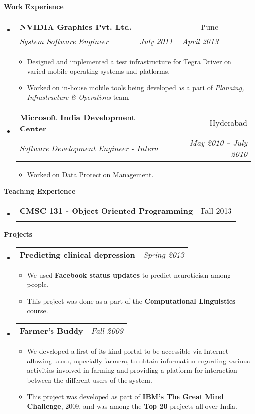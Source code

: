 \documentclass[letterpaper,12pt]{article}
\makeatletter
\newcommand{\resheading}[1]{{\large \colorbox{mygrey}{\begin{minipage}{\textwidth}{\textbf{#1 \vphantom{p\^{E}}}}\end{minipage}}}}
\newcommand{\ressubheading}[4]{
\begin{tabular*}{6in}{l@{\extracolsep{\fill}}r}
		\textbf{#1} & #2 \\
		\textit{#3} & \textit{#4} \\
\end{tabular*}\vspace{-6pt}}
\newcommand{\projectitem}[2]{
\begin{tabular*}{6in}{l@{\extracolsep{\fill}}r}
		\textbf{#1} & \textit{#2} 
\end{tabular*}\vspace{-6pt}}
\makeatother
\begin{document}
\resheading{Work Experience}
\begin {itemize}
 \item
\ressubheading{NVIDIA Graphics Pvt. Ltd.}{Pune}{System Software Engineer}{July 2011 -- April 2013}
{\footnotesize
  \begin{itemize}
  \item Designed and implemented a test infrastructure for Tegra Driver on varied mobile operating systems and platforms.
  \item Worked on in-house mobile tools being developed as a part of \textit{Planning, Infrastructure \& Operations} team.
  \end{itemize}
}
\item
\ressubheading{Microsoft India Development Center}{Hyderabad}{Software Development Engineer - Intern}{May 2010 -- July 2010}
{\footnotesize
  \begin{itemize}
  \item Worked on Data Protection Management.
  \end{itemize}
}
\end{itemize}

\resheading{Teaching Experience}
\begin{itemize}
\item []
 \ressubheading {CMSC 131 - Object Oriented Programming} {Fall 2013} {}{}
 \end{itemize}

\resheading{Projects}
\begin{itemize}
\item
\projectitem{Predicting clinical depression}{Spring 2013}
{\footnotesize
  \begin{itemize}
\item We used \textbf{Facebook status updates} to predict neuroticism among people.
\item This project was done as a part of the \textbf{Computational Linguistics} course.
  \end{itemize}
}
\item
\projectitem{Farmer’s Buddy}{Fall 2009}
{\footnotesize
  \begin{itemize}
  \item We developed a first of its kind portal to be accessible via Internet allowing users, especially farmers, to obtain information regarding various activities involved in farming and providing a platform for interaction between the different users of the system.
  \item This project was developed as part of \textbf{IBM's The Great Mind Challenge}, 2009, and was among the \textbf{Top 20} projects all over India.
  \end{itemize}
}
\end{itemize}
\end{document}

